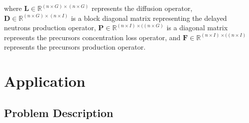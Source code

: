 \documentclass[review,number,sort&compress,12pt]{elsarticle}
\begin{document}
where $\mathbf{L} \in \mathbb{R}^{(n\times G)\times (n\times G)}$ represents the diffusion operator,
$\mathbf{D} \in \mathbb{R}^{(n\times G)\times (n\times I)}$ is a block diagonal matrix representing the delayed neutrons production operator,
$\mathbf{P} \in \mathbb{R}^{(n\times I)\times ((n\times G)}$ is a diagonal matrix represents the precursors concentration loss operator, 
and $\mathbf{F}\in \mathbb{R}^{(n\times I)\times ((n\times I)}$ represents the precursors production operator.

\section{Application}
\subsection{Problem Description}
\end{document}
